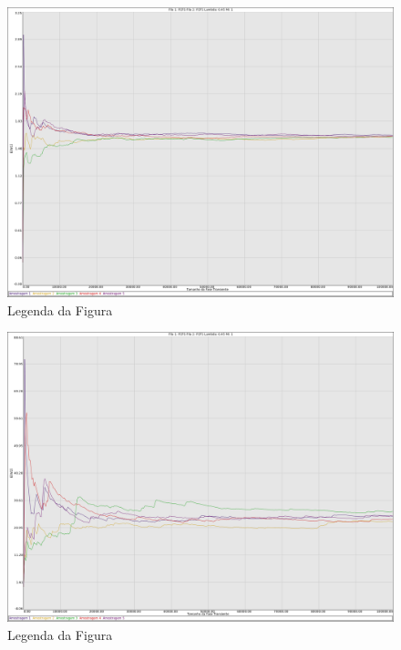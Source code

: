 \documentclass[a4paper,10pt]{article}
\begin{document}
\begin{figure}
	\caption{Legenda da Figura}
	\label{figTransienteFCFSfila1W}
	\includegraphics[scale = 0.2]{./graficos_transiente_1/FCFS/07.png}
\end{figure}

\begin{figure}
	\caption{Legenda da Figura}
	\label{figTransienteFCFSfila2W}
	\includegraphics[scale = 0.2]{./graficos_transiente_1/FCFS/08.png}
\end{figure}
\end{document}
